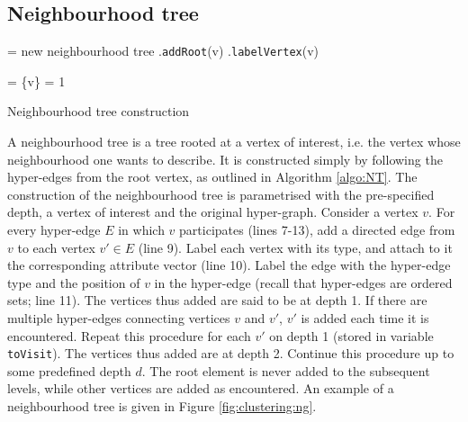 \subsection{Neighbourhood tree}
\label{sec:NT}



\begin{algorithm}[t]
\SetAlgoLined
{}
 \NT = new neighbourhood tree\;
 \NT.\texttt{addRoot}(v)\;
 \NT.\texttt{labelVertex}(v) 

 \Tovisit = \{v\} 
 \D = 1 

 \caption{Neighbourhood tree construction}
 \label{algo:NT}
\end{algorithm}


A neighbourhood tree is a tree rooted at a vertex of interest, i.e. the vertex whose neighbourhood one wants to describe.
It is constructed simply by following the hyper-edges from the root vertex, as outlined in Algorithm \ref{algo:NT}.
The construction of the neighbourhood tree is parametrised with the pre-specified depth, a vertex of interest and the original hyper-graph.
Consider a vertex $v$.
For every hyper-edge $E$ in which $v$ participates (lines 7-13), add a directed edge from $v$ to each vertex $v' \in E$ (line 9).
Label each vertex with its type, and attach to it the corresponding attribute vector (line 10).
Label the edge with the hyper-edge type and the position of $v$ in the hyper-edge (recall that hyper-edges are ordered sets; line 11).
The vertices thus added are said to be at depth 1.
If there are multiple hyper-edges connecting vertices $v$ and $v'$, $v'$ is added each time it is encountered.
Repeat this procedure for each $v'$ on depth 1 (stored in variable \texttt{toVisit}).
The vertices thus added are at depth 2.
Continue this procedure up to some predefined depth $d$.
The root element is never added to the subsequent levels, while other vertices are added as encountered.
An example of a neighbourhood tree is given in Figure \ref{fig:clustering:ng}.


